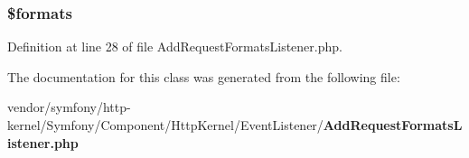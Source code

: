 \subsubsection[{\$formats}]{\setlength{\rightskip}{0pt plus 5cm}\$formats\hspace{0.3cm}{\ttfamily [protected]}}\label{class_symfony_1_1_component_1_1_http_kernel_1_1_event_listener_1_1_add_request_formats_listener_a22ecbd1b21f5e762994cdd8899058361}


Definition at line 28 of file Add\+Request\+Formats\+Listener.\+php.



The documentation for this class was generated from the following file\+:\begin{DoxyCompactItemize}
\item 
vendor/symfony/http-\/kernel/\+Symfony/\+Component/\+Http\+Kernel/\+Event\+Listener/{\bf Add\+Request\+Formats\+Listener.\+php}\end{DoxyCompactItemize}

